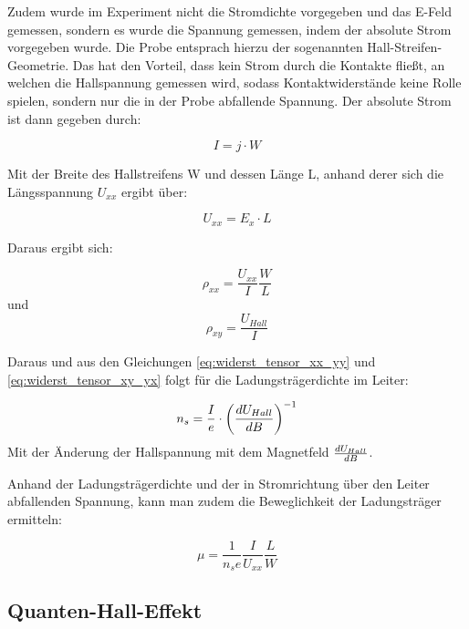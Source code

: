 Zudem wurde im Experiment nicht die Stromdichte vorgegeben und das E-Feld gemessen, sondern es wurde die Spannung gemessen, indem der absolute Strom vorgegeben wurde. Die Probe entsprach hierzu der sogenannten Hall-Streifen-Geometrie. 
Das hat den Vorteil, dass kein Strom durch die Kontakte fließt, an welchen die Hallspannung gemessen wird, sodass Kontaktwiderstände keine Rolle spielen, sondern nur die in der Probe abfallende Spannung. Der absolute Strom ist dann gegeben durch:

\begin{equation}
I=j \cdot W
\label{eq:absoluter_Strom}
\end{equation}

Mit der Breite des Hallstreifens W und dessen Länge L, anhand derer sich die Längsspannung $U_{xx}$ ergibt über:

\begin{equation}
U_{xx}=E_x \cdot L
\label{eq:laengsspannung}
\end{equation}

Daraus ergibt sich:

\begin{equation}
\rho_{xx}=\frac{U_{xx}}{I}\frac{W}{L}
\label{eq:rho_xx}
\end{equation}
und
\begin{equation}
\rho_{xy}=\frac{U_{Hall}}{I}
\label{eq:rho_xy}
\end{equation}

Daraus und aus den Gleichungen \ref{eq:widerst_tensor_xx_yy} und \ref{eq:widerst_tensor_xy_yx} folgt für die Ladungsträgerdichte im Leiter:
 
 \begin{equation}
 n_s=\frac{I}{e} \cdot \left( \frac{d U_{Hall}}{d B} \right)^{-1}
 \label{eq:ladungsdichte_steig}
 \end{equation}
 Mit der Änderung der Hallspannung mit dem Magnetfeld $\frac{d U_{Hall}}{d B}$. 
 
 Anhand der Ladungsträgerdichte und der in Stromrichtung über den Leiter abfallenden Spannung, kann man zudem die Beweglichkeit der Ladungsträger ermitteln:
 
 \begin{equation}
 \mu=\frac{1}{n_se}\frac{I}{U_{xx}}\frac{L}{W}
 \label{eq:bewegl_masse}
 \end{equation}


\subsection{Quanten-Hall-Effekt}

